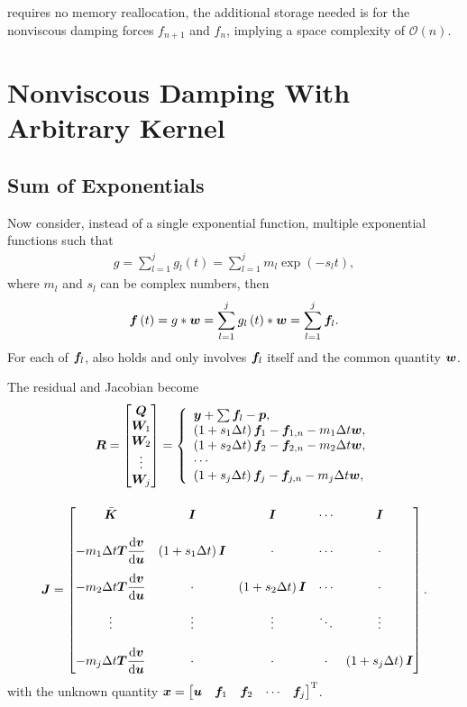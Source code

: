  requires no memory reallocation, the additional storage needed is for the nonviscous damping forces $f_{n+1}$ and $f_n$, implying a space complexity of $\mathcal{O}\left(n\right)$.
\section{Nonviscous Damping With Arbitrary Kernel}
\subsection{Sum of Exponentials}
Now consider, instead of a single exponential function, multiple exponential functions such that
\begin{gather}\label{eq:sum_exp}
g=\sum_{l=1}^{j}g_l\left(t\right)=\sum_{l=1}^{j}m_l\exp\left(-s_lt\right),
\end{gather}
where $m_l$ and $s_l$ can be complex numbers, then
\begin{gather}\label{eq:sum_conv}
\bm{f}\left(t\right)=g*\bm{w}=\sum_{l=1}^{j}g_l\left(t\right)*\bm{w}=\sum_{l=1}^{j}\bm{f}_l.
\end{gather}
For each of $\bm{f}_l$,  also holds and only involves $\bm{f}_l$ itself and the common quantity $\bm{w}$.

The residual and Jacobian become
\begin{gather}\label{eq:residual_multi}
\bm{R}=\begin{bmatrix}
\bm{Q}\\\bm{W}_1\\\bm{W}_2\\\vdots\\\bm{W}_j
\end{bmatrix}=\left\{
\begin{array}{l}
\bm{y}+\sum\bm{f}_l-\bm{p},\\
\left(1+s_1\Delta{}t\right)\bm{f}_1-\bm{f}_{1,n}-m_1\Delta{}t\bm{w},\\
\left(1+s_2\Delta{}t\right)\bm{f}_2-\bm{f}_{2,n}-m_2\Delta{}t\bm{w},\\
\cdots\\
\left(1+s_j\Delta{}t\right)\bm{f}_j-\bm{f}_{j,n}-m_j\Delta{}t\bm{w},\\
\end{array}
\right.\\[4mm]\label{eq:jacobian_multi}
\bm{J}=\begin{bmatrix}
\bar{\bm{K}}&\bm{I}&\bm{I}&\cdots&\bm{I}\\[4mm]
-m_1\Delta{}t\bm{T}\dfrac{\mathrm{d}\bm{v}}{\mathrm{d}\bm{u}}&\left(1+s_1\Delta{}t\right)\bm{I}&\cdot&\cdots&\cdot\\[4mm]
-m_2\Delta{}t\bm{T}\dfrac{\mathrm{d}\bm{v}}{\mathrm{d}\bm{u}}&\cdot&\left(1+s_2\Delta{}t\right)\bm{I}&\cdots&\cdot\\[4mm]
\vdots&\vdots&\vdots&\ddots&\vdots\\[4mm]
-m_j\Delta{}t\bm{T}\dfrac{\mathrm{d}\bm{v}}{\mathrm{d}\bm{u}}&\cdot&\cdot&\cdot&\left(1+s_j\Delta{}t\right)\bm{I}
\end{bmatrix}.
\end{gather}
with the unknown quantity $\bm{x}=\begin{bmatrix}
\bm{u}&\bm{f}_1&\bm{f}_2&\cdots&\bm{f}_j
\end{bmatrix}^{\mathrm{T}}$.

